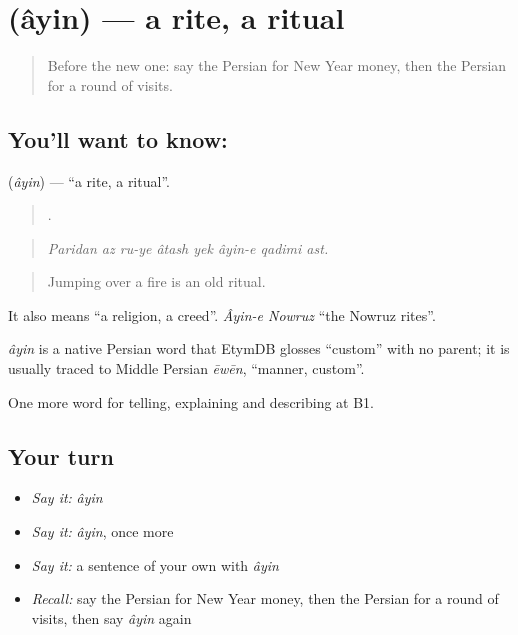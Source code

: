 \section[\texorpdfstring{\fa{آیین} (âyin)}{آیین (âyin)}]{ (âyin) — a rite, a ritual}

\label{lesson:FA-C340-ayin}



\begin{quote}
Before the new one: say the Persian for New Year money, then the Persian for a round of visits.
\end{quote}

\subsection*{You'll want to know: }
\textbf{} (\emph{âyin}) — \textquotedblleft{}a rite, a ritual\textquotedblright{}.

\begin{quote}
       .
\end{quote}

\begin{quote}
\emph{Paridan az ru-ye âtash yek âyin-e qadimi ast.}
\end{quote}

\begin{quote}
Jumping over a fire is an old ritual.
\end{quote}

It also means \textquotedblleft{}a religion, a creed\textquotedblright{}. \emph{Âyin-e Nowruz} \textquotedblleft{}the Nowruz rites\textquotedblright{}.

\begin{cousinweb}
\emph{âyin} is a native Persian word that EtymDB glosses \textquotedblleft{}custom\textquotedblright{} with no parent; it is usually traced to Middle Persian \emph{ēwēn}, \textquotedblleft{}manner, custom\textquotedblright{}.
\end{cousinweb}

\begin{grammarlens}[title={What you've built}]
One more word for telling, explaining and describing at B1.
\end{grammarlens}

\subsection*{Your turn}
\begin{itemize}
\raggedright
  \item \emph{Say it:} \emph{âyin}
  \item \emph{Say it:} \emph{âyin}, once more
  \item \emph{Say it:} a sentence of your own with \emph{âyin}
  \item \emph{Recall:} say the Persian for New Year money, then the Persian for a round of visits, then say \emph{âyin} again
\end{itemize}

